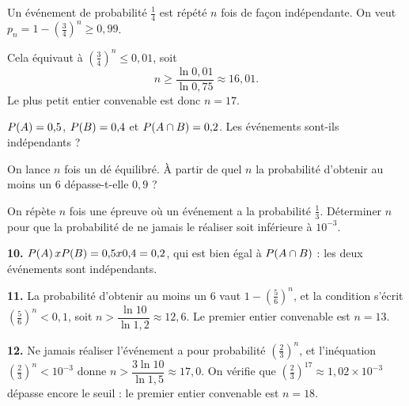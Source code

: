 \begin{exemple}
Un événement de probabilité $\frac14$ est répété $n$ fois de façon
indépendante. On veut $p_{n} = 1-\left(\frac34\right)^{n} \geq 0{,}99$.

Cela équivaut à $\left(\frac34\right)^{n} \leq 0{,}01$, soit
\[
  n \geq \frac{\ln 0{,}01}{\ln 0{,}75} \approx 16{,}01 .
\]
Le plus petit entier convenable est donc $n = 17$.
\end{exemple}

\begin{entrainement}[indépendance]
\exo[\niveau{1}] $P\!\left(A\right) = 0{,}5$, $P\!\left(B\right) = 0{,}4$ et
$P\!\left(A \cap B\right) = 0{,}2$. Les événements sont-ils indépendants ?

\exo[\niveau{2}] On lance $n$ fois un dé équilibré. À partir de quel $n$ la
probabilité d'obtenir au moins un $6$ dépasse-t-elle $0{,}9$ ?

\exo[\niveau{3}] On répète $n$ fois une épreuve où un événement a la
probabilité $\frac13$. Déterminer $n$ pour que la probabilité de ne jamais le
réaliser soit inférieure à $10^{-3}$.
\end{entrainement}

\begin{corrige}
\textbf{10.} $P\!\left(A\right) x P\!\left(B\right) = 0{,}5 x 0{,}4 = 0{,}2$, qui
est bien égal à $P\!\left(A \cap B\right)$ : les deux événements sont indépendants.

\textbf{11.} La probabilité d'obtenir au moins un $6$ vaut
$1-\left(\frac56\right)^{n}$, et la condition s'écrit
$\left(\frac56\right)^{n}<0{,}1$, soit
$n > \dfrac{\ln 10}{\ln 1{,}2} \approx 12{,}6$. Le premier entier convenable
est $n = 13$.

\textbf{12.} Ne jamais réaliser l'événement a pour probabilité
$\left(\frac23\right)^{n}$, et l'inéquation
$\left(\frac23\right)^{n}<10^{-3}$ donne
$n > \dfrac{3\ln 10}{\ln 1{,}5} \approx 17{,}0$. On vérifie que
$\left(\frac23\right)^{17} \approx 1{,}02\times10^{-3}$ dépasse encore le
seuil : le premier entier convenable est $n = 18$.
\end{corrige}

